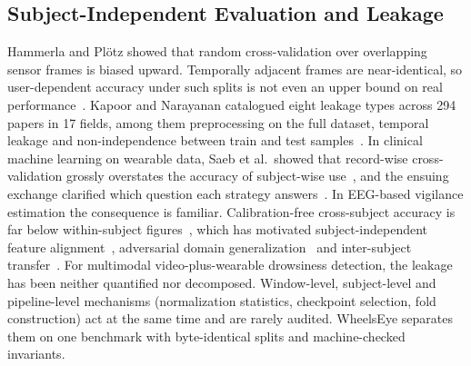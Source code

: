\documentclass[journal]{IEEEtran}
\newcommand{\sysname}{WheelsEye}
\begin{document}
\subsection{Subject-Independent Evaluation and Leakage}
Hammerla and Pl\"otz showed that random cross-validation over overlapping
sensor frames is biased upward. Temporally adjacent frames are near-identical,
so user-dependent accuracy under such splits is not even an upper bound on
real performance~\cite{hammerla2015stick}. Kapoor and Narayanan catalogued
eight leakage types across 294 papers in 17 fields, among them preprocessing
on the full dataset, temporal leakage and non-independence between train and
test samples~\cite{kapoor2023leakage}. In clinical machine learning on
wearable data, Saeb et al.\ showed that record-wise cross-validation grossly
overstates the accuracy of subject-wise use~\cite{saeb2017usecase}, and the
ensuing exchange clarified which question each strategy
answers~\cite{little2017crossval}. In EEG-based vigilance estimation the
consequence is familiar. Calibration-free cross-subject accuracy is far below
within-subject figures~\cite{cui2022compact}, which has motivated
subject-independent feature alignment~\cite{shen2021subject}, adversarial
domain generalization~\cite{ma2019depersonalized} and inter-subject
transfer~\cite{liu2020intersubject}. For multimodal video-plus-wearable
drowsiness detection, the leakage has been neither quantified nor decomposed.
Window-level, subject-level and pipeline-level mechanisms (normalization
statistics, checkpoint selection, fold construction) act at the same time and
are rarely audited. \sysname{} separates them on one benchmark with
byte-identical splits and machine-checked invariants.
\end{document}
